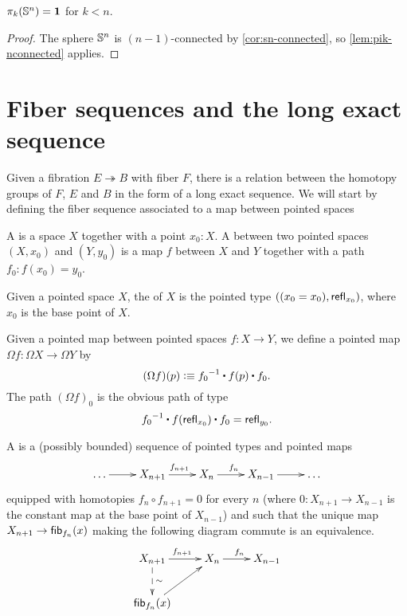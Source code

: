 \begin{cor}
  $\pi_k(\mathbb{S} ^n) = \mathbf{1}$ for $k < n$.
\end{cor}
\begin{proof}
  The sphere $\mathbb{S}^n$ is $(n-1)$-connected by \autoref{cor:sn-connected}, so
  \autoref{lem:pik-nconnected} applies.
\end{proof}

\section{Fiber sequences and the long exact sequence}
\label{sec:long-exact-sequence-homotopy-groups}

Given a fibration $E \twoheadrightarrow B$ with fiber $F$, there is a relation
between the homotopy groups of $F$, $E$ and $B$ in the form of a long exact
sequence. We will start by defining the fiber sequence associated to a map
between pointed spaces

\begin{defn}
  A  is a space $X$ together with a point $x_0:X$.
  A  between two pointed spaces $(X,x_0)$ and $(Y,y_0)$ is a
  map $f$ between $X$ and $Y$ together with a path $f_0:f(x_0)=y_0$.
\end{defn}

\begin{defn}
  Given a pointed space $X$, the  of $X$ is the pointed type
  $((x_0=x_0), \mathsf{refl}_{x_0})$, where $x_0$ is the base point of $X$.
\end{defn}

\begin{defn}
  Given a pointed map between pointed spaces $f:X \to Y$, we define a pointed
  map $\Omega f:\Omega X
  \to \Omega Y$ by
  \[(\Omega f)(p) \defeq \rev{f_0}\ct\ap{f}{p}\ct f_0.\]
  The path $(\Omega f)_0$ is the obvious path of type
  \[\rev{f_0}\ct\ap{f}{\refl{x_0}}\ct f_0=\refl{y_0}.\]
\end{defn}

\begin{defn}
  A  is a (possibly bounded) sequence of pointed types
  and pointed maps
  \[\xymatrix{\dots \ar[r] & X_{n+1} \ar^{f_{n+1}}[r] & X_n \ar^{f_n}[r] & X_{n-1} \ar[r] &
    \dots}\]
  equipped with homotopies $f_n\circ f_{n+1}=0$ for every $n$ (where
  $0:X_{n+1}\to X_{n-1}$ is the constant map at the base point of $X_{n-1}$) and
  such that the unique map $X_{n+1}\to{\mathsf{fib}}_{f_n}(x)$ making the following diagram
  commute is an equivalence.
  \[\xymatrix{X_{n+1} \ar@{-->}^\sim[d] \ar^{f_{n+1}}[r] & X_n \ar^{f_n}[r] & X_{n-1} \\
    \hfib{f_n}{x} \ar[ur] & &}\]
\end{defn}

